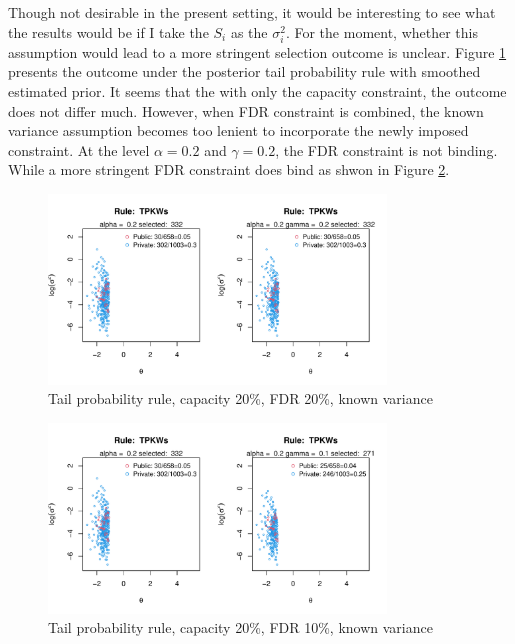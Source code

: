 \documentclass[12pt]{article}
\begin{document}
Though not desirable in the present setting, it would be interesting to see
what the results would be if I take the $S_i$ as the $\sigma_i^2$. For the
moment, whether this assumption would lead to a more stringent selection
outcome is unclear. Figure \ref{fig:tp_0.2_0.2_1d} presents the outcome under
the posterior tail probability rule with smoothed estimated prior. It seems
that the with only the capacity constraint, the outcome does not differ much.
However, when FDR constraint is combined, the known variance assumption becomes
too lenient to incorporate the newly imposed constraint. At the level
$\alpha=0.2$ and $\gamma=0.2$, the FDR constraint is not binding. While a more
stringent FDR constraint does bind as shwon in Figure \ref{fig:tp_0.2_0.1_1d}.

\begin{figure}[h!]
    \centering
    \includegraphics[width=0.8\textwidth]{../../Figures/2013-2022/GMM_m/GLmix/Left_0.2_0.2_TPKWs.pdf}
    \caption{Tail probability rule, capacity 20\%, FDR 20\%, known variance}
    \label{fig:tp_0.2_0.2_1d}
\end{figure}

\begin{figure}[h!]
    \centering
    \includegraphics[width=0.8\textwidth]{../../Figures/2013-2022/GMM_m/GLmix/Left_0.2_0.1_TPKWs.pdf}
    \caption{Tail probability rule, capacity 20\%, FDR 10\%, known variance}
    \label{fig:tp_0.2_0.1_1d}
\end{figure}
\end{document}
